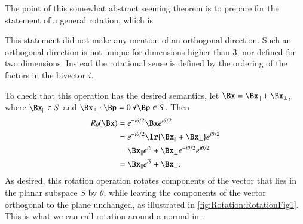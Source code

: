 
The point of this somewhat abstract seeming theorem is to prepare for the statement of a general  rotation, which is

This statement did not make any mention of an orthogonal direction.
Such an orthogonal direction is not unique for dimensions higher than 3, nor defined for two dimensions.
Instead the rotational sense is defined by the ordering of the factors in the bivector \( i \).

To check that this operation has the desired semantics,
let \( \Bx = \Bx_\parallel + \Bx_\perp \), where \( \Bx_\parallel \in S \) and \( \Bx_\perp \cdot \Bp = 0 \,\forall \Bp \in S \).
Then
\begin{equation}\label{eqn:generalRotation:1880}
\begin{aligned}
R_\theta(\Bx)
&= e^{ - i \theta/2 } \Bx e^{ i\theta/2 } \\
&= e^{ - i \theta/2 } \lr{ \Bx_\parallel + \Bx_\perp } e^{ i\theta/2 } \\
&= \Bx_\parallel e^{ i\theta } + \Bx_\perp e^{ - i \theta/2 } e^{ i\theta/2 } \\
&= \Bx_\parallel e^{ i\theta } + \Bx_\perp.
\end{aligned}
\end{equation}
As desired, this rotation operation rotates components of the vector that lies in the planar subspace \( S \) by \( \theta \), while leaving the components of the vector orthogonal to the plane unchanged, as illustrated in \cref{fig:Rotation:RotationFig1}.
This is what we can call rotation around a normal in .
